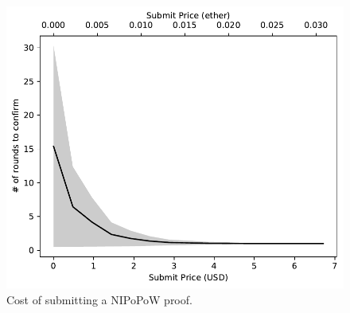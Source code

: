\begin{figure}
    \centering
    \includegraphics[width=\ourfigurescale\columnwidth]{figures/cryptoeconomics-submit.pdf}
    \caption{Cost of submitting a NIPoPoW proof.}
    \label{fig:cryptoeconomics-submit}
\end{figure}


